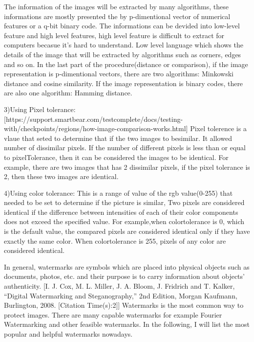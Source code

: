 The information of the images will be extracted by many algorithms, 
these informations are mostly presented the by p-dimentional vector of numerical features or a q-bit binary code.
The informations can be devided into low-level feature and high level features, 
high level feature is difficult to extract for computers becasue it's hard to understand.
Low level language which shows the details of the image that will be extracted by algorithms such as corners, edges and so on.
In the last part of the procedure(distance or comparison), if the image representation is p-dimentional vectors,
there are two algorithms: Minkowski distance and cosine similarity. If the image representation is binary codes, 
there are also one algorithm: Hamming distance.

3)Using Pixel tolerance:
[https://support.smartbear.com/testcomplete/docs/testing-with/checkpoints/regions/how-image-comparison-works.html]
Pixel tolerence is a vlaue that seted to determine that if the two images to besimilar.
It allowed number of dissimilar pixels. 
If the number of different pixels is less than or equal to pixelTolerance, 
then it can be considered the images to be identical.
For example, there are two images that has 2 dissimilar pixels,
if the pixel tolerance is 2, then these two images are identical.

4)Using color tolerance:
This is a range of value of the rgb value(0-255) that needed to be set to determine if the picture is similar,
Two pixels are considered identical if the difference between intensities of each of their color components does not exceed the specified value.
For example,when colortolerance is 0, which is the default value, the compared pixels are considered identical only if they have exactly the same color. 
When colortolerance is 255, pixels of any color are considered identical.


In general, 
watermarks are symbols which are placed into physical objects such as documents, photos, etc. and their purpose is to carry information about objects’ authenticity.
[I. J. Cox, M. L. Miller, J. A. Bloom, J. Fridrich and T. Kalker, “Digital Watermarking and Steganography,” 2nd Edition, Morgan Kaufmann, Burlington, 2008.   [Citation Time(s):2]]
Watermarks is the most common way to protect images.
There are many capable watermarks for example Fourier Watermarking and other feasible watermarks.
In the following, I will list the most popular and helpful watermarks nowadays.


